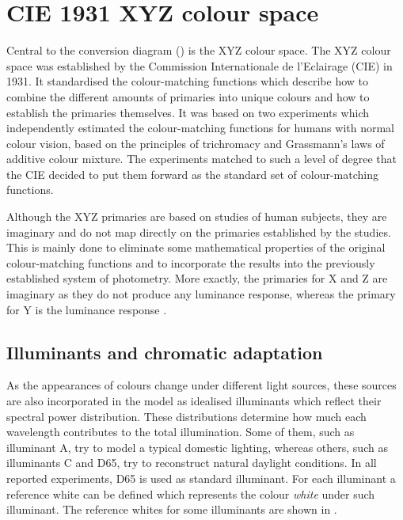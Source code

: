 \section{CIE 1931 XYZ colour space}
\label{s:xyz}

Central to the conversion diagram () is the
XYZ colour space. The XYZ colour space was established by the
Commission Internationale de l'Eclairage (CIE) in 1931. It standardised
the colour-matching functions which describe how to combine the
different amounts of primaries into unique colours and how to establish
the primaries themselves. It was based on two experiments
\citep{wright28, guild31} which independently estimated the
colour-matching functions for humans with normal colour vision, based
on the principles of trichromacy and Grassmann's laws of additive
colour mixture. The experiments matched to such a level of degree that
the CIE decided to put them forward as the standard set of
colour-matching functions.

Although the XYZ primaries are based on studies of human subjects,
they are imaginary and do not map directly on the primaries
established by the studies. This is mainly done to eliminate some
mathematical properties of the original colour-matching functions and
to incorporate the results into the previously established system of
photometry. More exactly, the primaries for X and Z are imaginary as
they do not produce any luminance response, whereas the primary for Y
is the luminance response \citep{fairchild98color}.

\subsection{Illuminants and chromatic adaptation}

As the appearances of colours change under different light sources,
these sources are also incorporated in the model as idealised
illuminants which reflect their spectral power distribution. These
distributions determine how much each wavelength contributes to the
total illumination. Some of them, such as illuminant A, try to model a
typical domestic lighting, whereas others, such as illuminants C and
D65, try to reconstruct natural daylight conditions. In all reported
experiments, D65 is used as standard illuminant. For each illuminant a
reference white can be defined which represents the colour \textit{white}
under such illuminant. The reference whites for some illuminants are
shown in .


